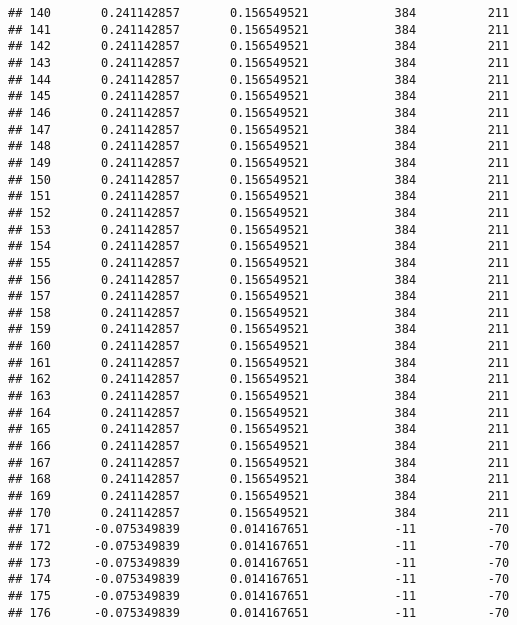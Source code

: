 \documentclass[]{article}
\begin{document}
\begin{verbatim}
## 140       0.241142857       0.156549521            384          211
## 141       0.241142857       0.156549521            384          211
## 142       0.241142857       0.156549521            384          211
## 143       0.241142857       0.156549521            384          211
## 144       0.241142857       0.156549521            384          211
## 145       0.241142857       0.156549521            384          211
## 146       0.241142857       0.156549521            384          211
## 147       0.241142857       0.156549521            384          211
## 148       0.241142857       0.156549521            384          211
## 149       0.241142857       0.156549521            384          211
## 150       0.241142857       0.156549521            384          211
## 151       0.241142857       0.156549521            384          211
## 152       0.241142857       0.156549521            384          211
## 153       0.241142857       0.156549521            384          211
## 154       0.241142857       0.156549521            384          211
## 155       0.241142857       0.156549521            384          211
## 156       0.241142857       0.156549521            384          211
## 157       0.241142857       0.156549521            384          211
## 158       0.241142857       0.156549521            384          211
## 159       0.241142857       0.156549521            384          211
## 160       0.241142857       0.156549521            384          211
## 161       0.241142857       0.156549521            384          211
## 162       0.241142857       0.156549521            384          211
## 163       0.241142857       0.156549521            384          211
## 164       0.241142857       0.156549521            384          211
## 165       0.241142857       0.156549521            384          211
## 166       0.241142857       0.156549521            384          211
## 167       0.241142857       0.156549521            384          211
## 168       0.241142857       0.156549521            384          211
## 169       0.241142857       0.156549521            384          211
## 170       0.241142857       0.156549521            384          211
## 171      -0.075349839       0.014167651            -11          -70
## 172      -0.075349839       0.014167651            -11          -70
## 173      -0.075349839       0.014167651            -11          -70
## 174      -0.075349839       0.014167651            -11          -70
## 175      -0.075349839       0.014167651            -11          -70
## 176      -0.075349839       0.014167651            -11          -70

\end{verbatim}
\end{document}
